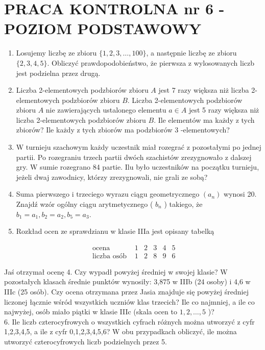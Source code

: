 \documentclass[10pt]{article}
\begin{document}
\section*{PRACA KONTROLNA nr 6 - POZIOM PODSTAWOWY}
\begin{enumerate}
  \item Losujemy liczbę ze zbioru $\{1,2,3, \ldots, 100\}$, a następnie liczbę ze zbioru $\{2,3,4,5\}$. Obliczyć prawdopodobieństwo, że pierwsza z wylosowanych liczb jest podzielna przez drugą.
  \item Liczba 2-elementowych podzbiorów zbioru $A$ jest 7 razy większa niż liczba 2-elementowych podzbiorów zbioru $B$. Liczba 2-elementowych podzbiorów zbioru $A$ nie zawierających ustalonego elementu $a \in A$ jest 5 razy większa niż liczba 2-elementowych podzbiorów zbioru $B$. Ile elementów ma każdy z tych zbiorów? Ile każdy z tych zbiorów ma podzbiorów 3 -elementowych?
  \item W turnieju szachowym każdy uczestnik miał rozegrać z pozostałymi po jednej partii. Po rozegraniu trzech partii dwóch szachistów zrezygnowało z dalszej gry. W sumie rozegrano 84 partie. Ilu było uczestników na początku turnieju, jeżeli dwaj zawodnicy, którzy zrezygnowali, nie grali ze sobą?
  \item Suma pierwszego i trzeciego wyrazu ciągu geometrycznego $\left(a_{n}\right)$ wynosi 20. Znajdź wzór ogólny ciągu arytmetycznego ( $b_{n}$ ) takiego, że $b_{1}=a_{1}, b_{2}=a_{2}, b_{5}=a_{3}$.
  \item Rozkład ocen ze sprawdzianu w klasie IIIa jest opisany tabelką
\end{enumerate}

$$
\begin{array}{c|c|c|c|c|c}
\text { ocena } & 1 & 2 & 3 & 4 & 5 \\
\hline \text { liczba osób } & 1 & 2 & 8 & 9 & 6
\end{array}
$$

Jaś otrzymał ocenę 4. Czy wypadł powyżej średniej w swojej klasie? W pozostałych klasach średnie punktów wynosiły: 3,875 w IIIb (24 osoby) i 4,6 w IIIc (25 osób). Czy ocena otrzymana przez Jasia znajduje się powyżej średniej liczonej łącznie wśród wszystkich uczniów klas trzecich? Ile co najmniej, a ile co najwyżej, osób miało piątki w klasie IIIc (skala ocen to $1,2, \ldots, 5$ )?\\
6. Ile liczb czterocyfrowych o wszystkich cyfrach różnych można utworzyć z cyfr 1,2,3,4,5, a ile z cyfr 0,1,2,3,4,5,6? W obu przypadkach obliczyć, ile można utworzyć czterocyfrowych liczb podzielnych przez 5.
\end{document}
